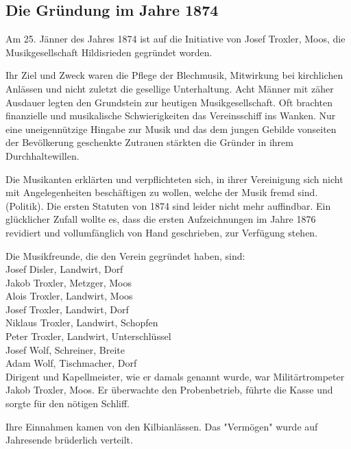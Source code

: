 \begin{history}

    \subsection{Die Gründung im Jahre 1874}

    Am 25. Jänner des Jahres 1874 ist auf die Initiative von Josef Troxler,
    Moos, die Musikgesellschaft Hildisrieden gegründet worden.

    Ihr Ziel und Zweck waren die Pflege der Blechmusik, Mitwirkung bei
    kirchlichen Anlässen und nicht zuletzt die gesellige Unterhaltung. Acht
    Männer mit zäher Ausdauer legten den Grundstein zur heutigen
    Musikgesellschaft. Oft brachten finanzielle und musikalische Schwierigkeiten
    das Vereinsschiff ins Wanken. Nur eine uneigennützige Hingabe zur Musik und
    das dem jungen Gebilde vonseiten der Bevölkerung geschenkte Zutrauen
    stärkten die Gründer in ihrem Durchhaltewillen.

    Die Musikanten erklärten und verpflichteten sich, in ihrer Vereinigung sich
    nicht mit Angelegenheiten beschäftigen zu wollen, welche der Musik fremd
    sind. (Politik). Die ersten Statuten von 1874 sind leider nicht mehr
    auffindbar. Ein glücklicher Zufall wollte es, dass die ersten Aufzeichnungen
    im Jahre 1876 revidiert und vollumfänglich von Hand geschrieben, zur
    Verfügung stehen.

    Die Musikfreunde, die den Verein gegründet haben, sind:\\

    \noindent
    Josef Disler, Landwirt, Dorf\\
    Jakob Troxler, Metzger, Moos\\
    Alois Troxler, Landwirt, Moos\\
    Josef Troxler, Landwirt, Dorf\\
    Niklaus Troxler, Landwirt, Schopfen\\
    Peter Troxler, Landwirt, Unterschlüssel\\
    Josef Wolf, Schreiner, Breite\\
    Adam Wolf, Tischmacher, Dorf\\


    Dirigent und Kapellmeister, wie er damals genannt wurde, war
    Militärtrompeter Jakob Troxler, Moos. Er überwachte den Probenbetrieb,
    führte die Kasse und sorgte für den nötigen Schliff.

    Ihre Einnahmen kamen von den Kilbianlässen. Das "Vermögen" wurde auf
    Jahresende brüderlich verteilt.

\end{history}
